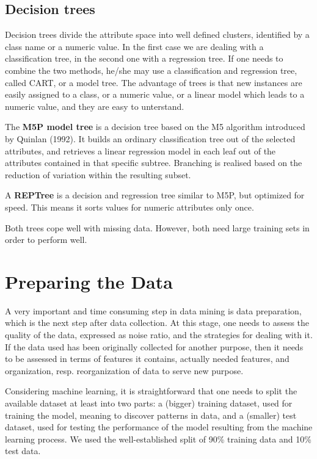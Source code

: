 \documentclass[11pt,a4paper]{scrbook}
\begin{document}
\subsection{Decision trees}
Decision trees divide the attribute space into well defined clusters, identified by a class name or a numeric value. In the first case we are dealing with a classification tree, in the second one with a regression tree. If one needs to combine the two methods, he/she may use a classification and regression tree, called CART, or a model tree. The advantage of trees is that new instances are easily assigned to a class, or a numeric value, or a linear model which leads to a numeric value, and they are easy to unterstand.

The \textbf{M5P model tree} is a decision tree based on the M5 algorithm introduced by Quinlan (1992). It builds an ordinary classification tree out of the selected attributes, and retrieves a linear regression model in each leaf out of the attributes contained in that specific subtree. Branching is realised based on the reduction of variation within the resulting subset.

A \textbf{REPTree} is a decision and regression tree similar to M5P, but optimized for speed. This means it sorts values for numeric attributes only once. 

Both trees cope well with missing data. However, both need large training sets in order to perform well.

\section{Preparing the Data}
A very important and time consuming step in data mining is data preparation, which is the next step after data collection. At this stage, one needs to assess the quality of the data, expressed as noise ratio, and the strategies for dealing with it. If the data used has been originally collected for another purpose, then it needs to be assessed in terms of features it contains, actually needed features, and organization, resp. reorganization of data to serve new purpose. 

Considering machine learning, it is straightforward that one needs to split the available dataset at least into two parts: a (bigger) training dataset, used for training the model, meaning to discover patterns in data, and a (smaller) test dataset, used for testing the performance of the model resulting from the machine learning process. We used the well-established split of 90\% training data and 10\% test data.
\end{document}
